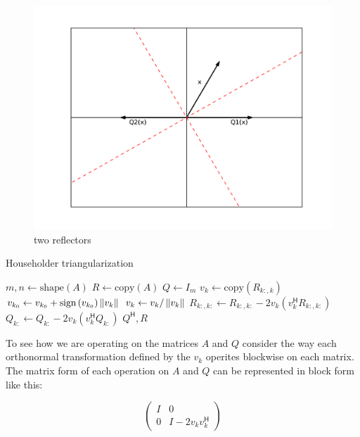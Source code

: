 \begin{figure}
\includegraphics[width= \textwidth]{fig2}
\caption{two reflectors}
\label{fig:two reflectors}
\end{figure}

\begin{algorithm}
\caption{Householder triangularization}
\label{Alg:Householder}
\begin{algorithmic}[1]
\State $m, n \gets \text{shape} \left( A \right)$
\State $R \gets \text{copy} \left( A \right)$
\State $Q \gets I_m$
    \State $v_k \gets \text{copy} \left( R_{k:,k} \right)$
    \State $v_{k_0} \gets v_{k_0} + \text{sign} \left( v_{k_0} \right) \left\lVert v_k\right\rVert$
    \State $v_k \gets v_k / \left\lVert v_k\right\rVert$
    \State $R_{k:,k:} \gets R_{k:,k:} - 2 v_k \left( v_k^\mathsf{H} R_{k:,k:} \right)$
    \State $Q_{k:} \gets Q_{k:} - 2 v_k \left( v_k^\mathsf{H} Q_{k:} \right)$
\EndFor
\State {} $Q^\mathsf{H}, R$
\EndProcedure
\end{algorithmic}
\end{algorithm}

To see how we are operating on the matrices $A$ and $Q$ consider the way each orthonormal transformation defined by the $v_k$ operites blockwise on each matrix.
The matrix form of each operation on $A$ and $Q$ can be represented in block form like this:

\[
\begin{pmatrix}
I & 0 \\
0 & I - 2 v_k v_k^\mathsf{H}
\end{pmatrix}
\]

